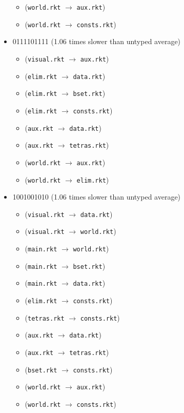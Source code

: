 \documentclass{article}
\newcommand{\mono}[1]{\texttt{#1}}
\begin{document}
\begin{itemize}
\begin{itemize}
  \item (\mono{world.rkt} $\rightarrow$ \mono{aux.rkt})
  \item (\mono{world.rkt} $\rightarrow$ \mono{consts.rkt})
  \end{itemize}
\item 0111101111 (1.06 times slower than untyped average)
  \begin{itemize}
  \item (\mono{visual.rkt} $\rightarrow$ \mono{aux.rkt})
  \item (\mono{elim.rkt} $\rightarrow$ \mono{data.rkt})
  \item (\mono{elim.rkt} $\rightarrow$ \mono{bset.rkt})
  \item (\mono{elim.rkt} $\rightarrow$ \mono{consts.rkt})
  \item (\mono{aux.rkt} $\rightarrow$ \mono{data.rkt})
  \item (\mono{aux.rkt} $\rightarrow$ \mono{tetras.rkt})
  \item (\mono{world.rkt} $\rightarrow$ \mono{aux.rkt})
  \item (\mono{world.rkt} $\rightarrow$ \mono{elim.rkt})
  \end{itemize}
\item 1001001010 (1.06 times slower than untyped average)
  \begin{itemize}
  \item (\mono{visual.rkt} $\rightarrow$ \mono{data.rkt})
  \item (\mono{visual.rkt} $\rightarrow$ \mono{world.rkt})
  \item (\mono{main.rkt} $\rightarrow$ \mono{world.rkt})
  \item (\mono{main.rkt} $\rightarrow$ \mono{bset.rkt})
  \item (\mono{main.rkt} $\rightarrow$ \mono{data.rkt})
  \item (\mono{elim.rkt} $\rightarrow$ \mono{consts.rkt})
  \item (\mono{tetras.rkt} $\rightarrow$ \mono{consts.rkt})
  \item (\mono{aux.rkt} $\rightarrow$ \mono{data.rkt})
  \item (\mono{aux.rkt} $\rightarrow$ \mono{tetras.rkt})
  \item (\mono{bset.rkt} $\rightarrow$ \mono{consts.rkt})
  \item (\mono{world.rkt} $\rightarrow$ \mono{aux.rkt})
  \item (\mono{world.rkt} $\rightarrow$ \mono{consts.rkt})
  \end{itemize}

\end{itemize}
\end{document}
